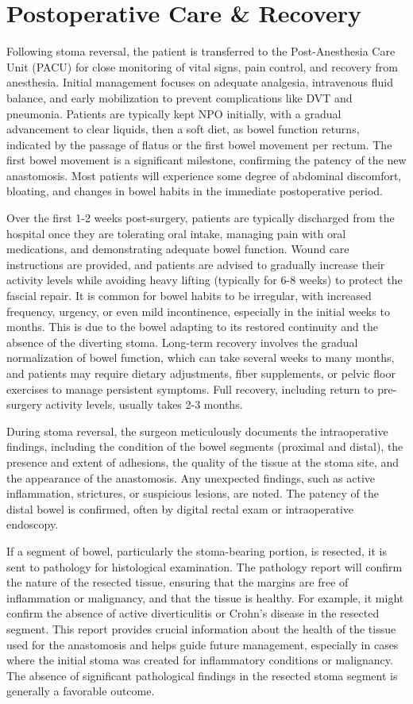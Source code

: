 \section*{Postoperative Care \& Recovery}
Following stoma reversal, the patient is transferred to the Post-Anesthesia Care Unit (PACU) for close monitoring of vital signs, pain control, and recovery from anesthesia. Initial management focuses on adequate analgesia, intravenous fluid balance, and early mobilization to prevent complications like DVT and pneumonia. Patients are typically kept NPO initially, with a gradual advancement to clear liquids, then a soft diet, as bowel function returns, indicated by the passage of flatus or the first bowel movement per rectum. The first bowel movement is a significant milestone, confirming the patency of the new anastomosis. Most patients will experience some degree of abdominal discomfort, bloating, and changes in bowel habits in the immediate postoperative period.

Over the first 1-2 weeks post-surgery, patients are typically discharged from the hospital once they are tolerating oral intake, managing pain with oral medications, and demonstrating adequate bowel function. Wound care instructions are provided, and patients are advised to gradually increase their activity levels while avoiding heavy lifting (typically for 6-8 weeks) to protect the fascial repair. It is common for bowel habits to be irregular, with increased frequency, urgency, or even mild incontinence, especially in the initial weeks to months. This is due to the bowel adapting to its restored continuity and the absence of the diverting stoma. Long-term recovery involves the gradual normalization of bowel function, which can take several weeks to many months, and patients may require dietary adjustments, fiber supplements, or pelvic floor exercises to manage persistent symptoms. Full recovery, including return to pre-surgery activity levels, usually takes 2-3 months.

During stoma reversal, the surgeon meticulously documents the intraoperative findings, including the condition of the bowel segments (proximal and distal), the presence and extent of adhesions, the quality of the tissue at the stoma site, and the appearance of the anastomosis. Any unexpected findings, such as active inflammation, strictures, or suspicious lesions, are noted. The patency of the distal bowel is confirmed, often by digital rectal exam or intraoperative endoscopy.

If a segment of bowel, particularly the stoma-bearing portion, is resected, it is sent to pathology for histological examination. The pathology report will confirm the nature of the resected tissue, ensuring that the margins are free of inflammation or malignancy, and that the tissue is healthy. For example, it might confirm the absence of active diverticulitis or Crohn's disease in the resected segment. This report provides crucial information about the health of the tissue used for the anastomosis and helps guide future management, especially in cases where the initial stoma was created for inflammatory conditions or malignancy. The absence of significant pathological findings in the resected stoma segment is generally a favorable outcome.

